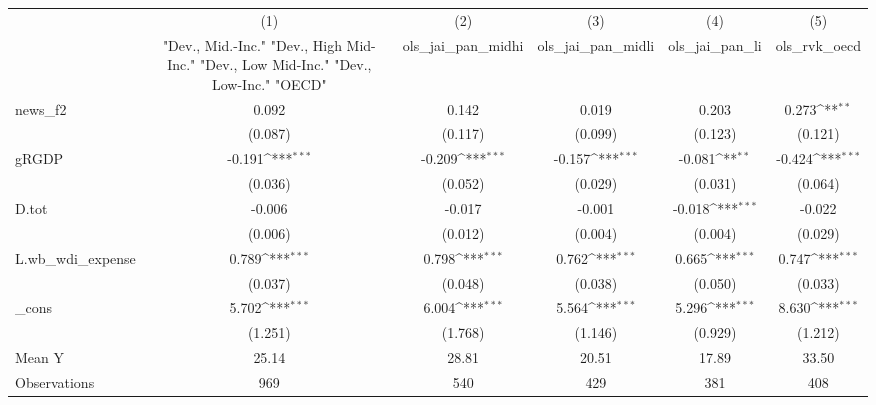 {
\def\sym#1{\ifmmode^{#1}\else\(^{#1}\)\fi}
\begin{tabular}{l*{5}{c}}
\toprule
            &\multicolumn{1}{c}{(1)}&\multicolumn{1}{c}{(2)}&\multicolumn{1}{c}{(3)}&\multicolumn{1}{c}{(4)}&\multicolumn{1}{c}{(5)}\\
            &\multicolumn{1}{c}{ "Dev., Mid.-Inc." "Dev., High Mid-Inc." "Dev., Low Mid-Inc." "Dev., Low-Inc." "OECD" }&\multicolumn{1}{c}{ols\_jai\_pan\_midhi}&\multicolumn{1}{c}{ols\_jai\_pan\_midli}&\multicolumn{1}{c}{ols\_jai\_pan\_li}&\multicolumn{1}{c}{ols\_rvk\_oecd}\\
\midrule
news\_f2     &       0.092         &       0.142         &       0.019         &       0.203         &       0.273\sym{**} \\
            &     (0.087)         &     (0.117)         &     (0.099)         &     (0.123)         &     (0.121)         \\
\addlinespace
gRGDP       &      -0.191\sym{***}&      -0.209\sym{***}&      -0.157\sym{***}&      -0.081\sym{**} &      -0.424\sym{***}\\
            &     (0.036)         &     (0.052)         &     (0.029)         &     (0.031)         &     (0.064)         \\
\addlinespace
D.tot       &      -0.006         &      -0.017         &      -0.001         &      -0.018\sym{***}&      -0.022         \\
            &     (0.006)         &     (0.012)         &     (0.004)         &     (0.004)         &     (0.029)         \\
\addlinespace
L.wb\_wdi\_expense&       0.789\sym{***}&       0.798\sym{***}&       0.762\sym{***}&       0.665\sym{***}&       0.747\sym{***}\\
            &     (0.037)         &     (0.048)         &     (0.038)         &     (0.050)         &     (0.033)         \\
\addlinespace
\_cons      &       5.702\sym{***}&       6.004\sym{***}&       5.564\sym{***}&       5.296\sym{***}&       8.630\sym{***}\\
            &     (1.251)         &     (1.768)         &     (1.146)         &     (0.929)         &     (1.212)         \\
\midrule
Mean Y      &       25.14         &       28.81         &       20.51         &       17.89         &       33.50         \\
Observations&         969         &         540         &         429         &         381         &         408         \\
\bottomrule
\end{tabular}
}
